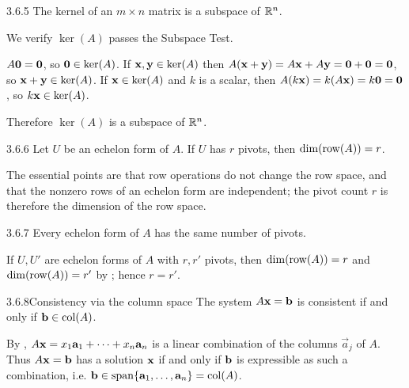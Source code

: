 \begin{thms}{3.6.5}{}
The kernel of an $m\times n$ matrix is a subspace of $\mathbb{R}^n$.
\end{thms}

\begin{prf}
We verify $\ker(A)$ passes the Subspace Test.
\begin{checks}
 $A\mathbf{0}=\mathbf{0}$, so $\mathbf{0}\in\ker(A)$.
 If $\mathbf{x},\mathbf{y}\in\ker(A)$ then $A(\mathbf{x}+\mathbf{y})=A\mathbf{x}+A\mathbf{y}=\mathbf{0}+\mathbf{0}=\mathbf{0}$, so $\mathbf{x}+\mathbf{y}\in\ker(A)$.
 If $\mathbf{x}\in\ker(A)$ and $k$ is a scalar, then $A(k\mathbf{x})=k(A\mathbf{x})=k\mathbf{0}=\mathbf{0}$, so $k\mathbf{x}\in\ker(A)$.
\end{checks}
Therefore $\ker(A)$ is a subspace of $\mathbb{R}^n$.
\end{prf}

\begin{thms}{3.6.6}{}
Let $U$ be an echelon form of $A$. If $U$ has $r$ pivots, then $\operatorname{dim}(\operatorname{row}(A))=r$.
\end{thms}

\begin{proofomit}[MTH2025]The essential points are that row operations do not change the row space, and that the nonzero rows of an echelon form are independent; the pivot count $r$ is therefore the dimension of the row space.
\end{proofomit}

\begin{cors}{3.6.7}{}
Every echelon form of $A$ has the same number of pivots.
\end{cors}

\begin{prf}
If $U,U'$ are echelon forms of $A$ with $r,r'$ pivots, then $\operatorname{dim}(\operatorname{row}(A))=r$ and $\operatorname{dim}(\operatorname{row}(A))=r'$ by ; hence $r=r'$.
\end{prf}

\begin{thms}{3.6.8}{Consistency via the column space}
The system $A\mathbf{x}=\mathbf{b}$ is consistent if and only if $\mathbf{b}\in\operatorname{col}(A)$.
\end{thms}

\begin{prf}
By , $A\mathbf{x}=x_1\mathbf{a}_1+\cdots+x_n\mathbf{a}_n$ is a linear combination of the columns $\vec{a}_j$ of $A$. Thus $A\mathbf{x}=\mathbf{b}$ has a solution $\mathbf{x}$ if and only if $\mathbf{b}$ is expressible as such a combination, i.e. $\mathbf{b}\in\operatorname{span}\{\mathbf{a}_1,\dots,\mathbf{a}_n\}=\operatorname{col}(A)$.
\end{prf}

